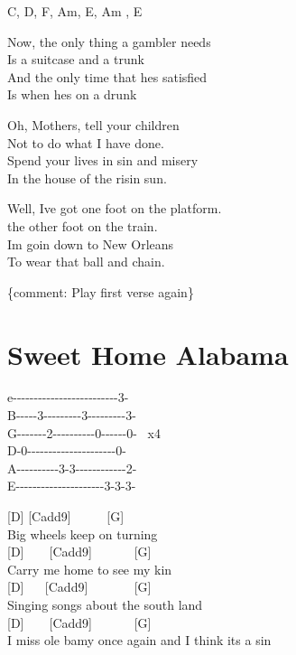 \documentclass[
  letterpaper,
  twoside=false]{scrbook}
\begin{document}
C, D, F, Am, E, Am , E

Now, the only thing a gambler needs\\
Is a suitcase and a trunk\\
And the only time that he\textquotesingle s satisfied\\
Is when he\textquotesingle s on a drunk

Oh, Mothers, tell your children\\
Not to do what I have done.\\
Spend your lives in sin and misery\\
In the house of the risin\textquotesingle{} sun.

Well, I\textquotesingle ve got one foot on the platform.\\
the other foot on the train.\\
I\textquotesingle m goin\textquotesingle{} down to New Orleans\\
To wear that ball and chain.

\{comment: Play first verse again\}

\hypertarget{sweet-home-alabama}{%
\chapter{Sweet Home Alabama}\label{sweet-home-alabama}}

e\textbar-\/-\/-\/-\/-\/-\/-\/-\/-\/-\/-\/-\/-\/-\/-\/-\/-\/-\/-\/-\/-\/-\/-\/-\/-3-\textbar{}\\
B\textbar-\/-\/-\/-\/-3-\/-\/-\/-\/-\/-\/-\/-\/-3-\/-\/-\/-\/-\/-\/-\/-\/-3-\textbar{}\\
G\textbar-\/-\/-\/-\/-\/-\/-2-\/-\/-\/-\/-\/-\/-\/-\/-\/-0-\/-\/-\/-\/-\/-0-\textbar{}
~x4\\
D-0-\/-\/-\/-\/-\/-\/-\/-\/-\/-\/-\/-\/-\/-\/-\/-\/-\/-\/-\/-\/-0-\textbar{}
~ ~\\
A\textbar-\/-\/-\/-\/-\/-\/-\/-\/-\/-3-3-\/-\/-\/-\/-\/-\/-\/-\/-\/-\/-\/-2-\textbar{}\\
E\textbar-\/-\/-\/-\/-\/-\/-\/-\/-\/-\/-\/-\/-\/-\/-\/-\/-\/-\/-\/-\/-3-3-3-\textbar{}

{[}D{]} {[}Cadd9{]} ~ ~ ~ {[}G{]}\\
Big wheels keep on turning\\
{[}D{]} ~ ~ {[}Cadd9{]} ~ ~ ~ ~{[}G{]}\\
Carry me home to see my kin\\
{[}D{]} ~ ~{[}Cadd9{]} ~ ~ ~ ~ {[}G{]}\\
Singing songs about the south land\\
{[}D{]} ~ ~ {[}Cadd9{]} ~ ~ ~ ~{[}G{]} ~ ~ ~ ~ ~ ~ ~ ~ ~ ~ ~ ~ ~\\
I miss \textquotesingle ole\textquotesingle{} \textquotesingle bamy once
again and I think it\textquotesingle s a sin
\end{document}
